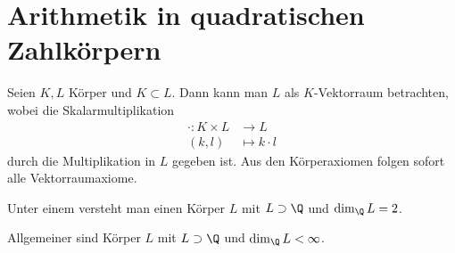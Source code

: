 \chapter{Arithmetik in quadratischen Zahlkörpern} \label{chap:4}

\begin{df} \label{4.1}
	Seien $K, L$ Körper und $K \subset L$.
	Dann kann man $L$ als $K$-Vektorraum betrachten, wobei die Skalarmultiplikation
	\begin{align*}
		\cdot : K \times L &\to L \\
		(k,l) &\mapsto k \cdot l
	\end{align*}
	durch die Multiplikation in $L$ gegeben ist.
	Aus den Körperaxiomen folgen sofort alle Vektorraumaxiome.
\end{df}

\begin{df} \label{4.2}
	Unter einem  versteht man einen Körper $L$ mit $L \supset \Q$ und $\dim_{\Q} L = 2$.

	Allgemeiner sind  Körper $L$ mit $L \supset \Q$ und $\dim_\Q L < \infty$.
\end{df}

